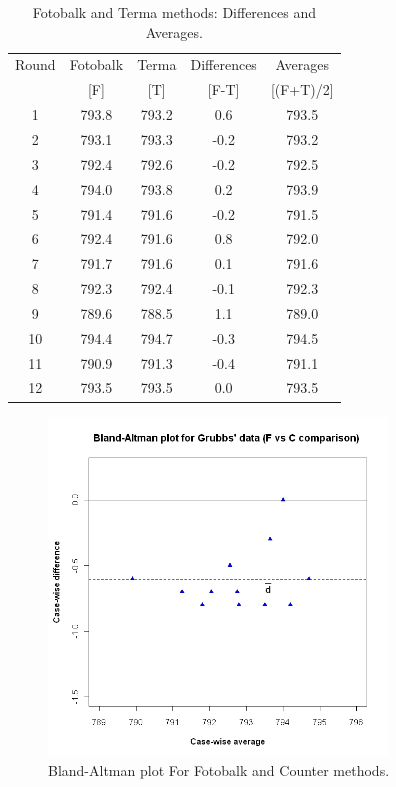 \documentclass[12pt, a4paper]{report}
\theoremstyle{plain}
\theoremstyle{definition}
\theoremstyle{remark}
\begin{document}
	\begin{table}[h!]
		\renewcommand\arraystretch{0.7}%
		\begin{center}
			\begin{tabular}{|c||c|c||c|c|}
				\hline
				Round & Fotobalk  & Terma  & Differences  & Averages  \\
				&  [F] & [T] & [F-T] &  [(F+T)/2] \\
				\hline
				1 & 793.8 & 793.2 & 0.6 & 793.5 \\
				2 & 793.1 & 793.3 & -0.2 & 793.2 \\
				3 & 792.4 & 792.6 & -0.2 & 792.5 \\
				4 & 794.0 & 793.8 & 0.2 & 793.9 \\
				5 & 791.4 & 791.6 & -0.2 & 791.5 \\
				6 & 792.4& 791.6 & 0.8 & 792.0 \\
				7 & 791.7 & 791.6 & 0.1 & 791.6 \\
				8 & 792.3 & 792.4 & -0.1 & 792.3 \\
				9 & 789.6 & 788.5 & 1.1 & 789.0 \\
				10 & 794.4 & 794.7 & -0.3 & 794.5 \\
				11 & 790.9 & 791.3 & -0.4 & 791.1 \\
				12 & 793.5 & 793.5 & 0.0 & 793.5 \\
				
				\hline
			\end{tabular}
			\caption{Fotobalk and Terma methods: Differences and Averages.}
			\label{GrubbsData2}
		\end{center}
	\end{table}
	
	\newpage
	
	\begin{figure}[h!]
		\begin{center}
			\includegraphics[width=90mm]{images/GrubbsBAplot-noLOA.jpeg}
			\caption{Bland-Altman plot For Fotobalk and Counter methods.}\label{GrubbsBA-noLOA}
		\end{center}
	\end{figure}
	
\end{document}
